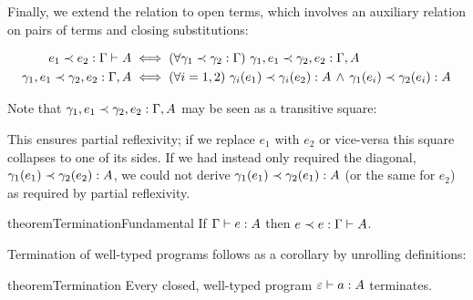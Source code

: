 \noindent
Finally, we extend the relation to open terms, which involves an auxiliary relation on pairs of terms and closing substitutions:

\begin{align*}
  \oplr{\Gamma \vdash A}{e_1}{e_2}
  &\iff
  \fa{\oplr \Gamma {\gamma_1}{\gamma_2}}
  \oplr{\Gamma,A}{\gamma_1,e_1}{\gamma_2,e_2}
  \\
  \oplr{\Gamma,A}{\gamma_1,e_1}{\gamma_2,e_2}
  &\iff
  \fa{i = 1,2}
  \oplrclosed A {\gamma_i(e_1)}{\gamma_i(e_2)}
  \wedge \oplrclosed A {\gamma_1(e_i)}{\gamma_2(e_i)}
\end{align*}

\newcommand{\precright}{%
  \arrow[no line]{r}{\rotatebox[origin=c]{0}{\scalebox{1.4}{$\prec$}}}}
\newcommand{\precdown}{%
  \arrow[no line]{d}{\rotatebox[origin=c]{-90}{\scalebox{1.4}{$\prec$}}}}

\noindent
Note that $\oplr{\Gamma,A}{\gamma_1,e_1}{\gamma_2,e_2}$ may be seen as a transitive square:

\begin{center}
  {}
\end{center}

\noindent
This ensures partial reflexivity; if we replace $e_1$ with $e_2$ or vice-versa this square collapses to one of its sides. If we had instead only required the diagonal, $\oplrclosed A {\gamma_1(e_1)}{\gamma_2(e_2)}$, we could not derive $\oplrclosed A {\gamma_1(e_1)} {\gamma_2(e_1)}$ (or the same for $e_2$) as required by partial reflexivity.

\begin{restatable}{theorem}{TerminationFundamental}
  \label{theorem-termination-fundamental}
  If $\J e \Gamma A$ then $\oplr{\Gamma \vdash A} e e$.
\end{restatable}

\noindent
Termination of well-typed programs follows as a corollary by unrolling definitions:

\begin{restatable}[Termination]{theorem}{Termination}
  Every closed, well-typed program $\J{a}{\emptycx}{A}$ terminates.
\end{restatable}

